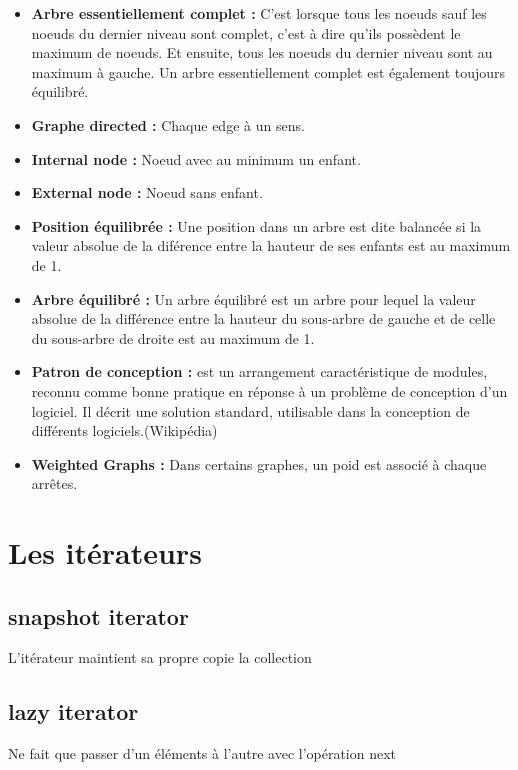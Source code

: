 \documentclass[a4paper]{article}
\begin{document}
\begin{itemize}
\item \textbf{Arbre essentiellement complet : } C'est lorsque tous les noeuds sauf les noeuds du dernier niveau sont complet, c'est à dire qu'ils possèdent le maximum de noeuds. Et ensuite, tous les noeuds du dernier niveau sont au maximum à gauche. Un arbre essentiellement complet est également toujours équilibré.

\item \textbf{Graphe directed : } Chaque edge à un sens.

\item \textbf{Internal node : } Noeud avec au minimum un enfant.

\item \textbf{External node : } Noeud sans enfant.

\item \textbf{Position équilibrée : } Une position dans un arbre est dite balancée si la valeur absolue de la diférence entre la hauteur de ses enfants est au maximum de 1.

\item \textbf{Arbre équilibré : } Un arbre équilibré est un arbre pour lequel la valeur absolue de la différence entre la hauteur du sous-arbre de gauche et de celle du sous-arbre de droite est au maximum de 1.

\item \textbf{Patron de conception : } est un arrangement caractéristique de modules, reconnu comme bonne pratique en réponse à un problème de conception d'un logiciel. Il décrit une solution standard, utilisable dans la conception de différents logiciels.(Wikipédia)

\item \textbf{Weighted Graphs : } Dans certains graphes, un poid est associé à chaque arrêtes.
\end{itemize}

\section{Les itérateurs}
\subsection{snapshot iterator}
L'itérateur maintient sa propre copie la collection
\subsection{lazy iterator}
Ne fait que passer d'un éléments à l'autre avec l'opération next
\end{document}
